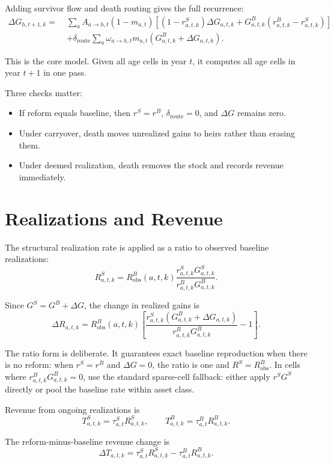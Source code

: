 \documentclass[11pt]{article}
\newcommand{\GB}{G^B}
\newcommand{\GS}{G^S}
\newcommand{\dG}{\Delta G}
\newcommand{\RB}{R^B}
\newcommand{\RS}{R^S}
\newcommand{\dR}{\Delta R}
\newcommand{\dT}{\Delta T}
\newcommand{\dd}{\delta}
\begin{document}
Adding survivor flow and death routing gives the full recurrence:
\[
\boxed{
\begin{aligned}
\dG_{h,t+1,k}
=\;&
\sum_a A_{a \to h,t}(1-m_{a,t})
\left[
(1-r^S_{a,t,k})\dG_{a,t,k}
+
\GB_{a,t,k}(r^B_{a,t,k}-r^S_{a,t,k})
\right] \\
&+
\dd_{\mathrm{route}}
\sum_a
\omega_{a \to h,t}m_{a,t}
\left(\GB_{a,t,k}+\dG_{a,t,k}\right).
\end{aligned}
}
\]

This is the core model. Given all age cells in year $t$, it computes all age
cells in year $t+1$ in one pass.

Three checks matter:

\begin{itemize}
  \item If reform equals baseline, then $r^S=r^B$, $\dd_{\mathrm{route}}=0$,
        and $\dG$ remains zero.
  \item Under carryover, death moves unrealized gains to heirs rather than
        erasing them.
  \item Under deemed realization, death removes the stock and records revenue
        immediately.
\end{itemize}

\section{Realizations and Revenue}

The structural realization rate is applied as a ratio to observed baseline
realizations:
\[
\boxed{
\RS_{a,t,k}
=
\RB_{\mathrm{obs}}(a,t,k)
\frac{
r^S_{a,t,k}\GS_{a,t,k}
}{
r^B_{a,t,k}\GB_{a,t,k}
}.
}
\]

Since $\GS=\GB+\dG$, the change in realized gains is
\[
\boxed{
\dR_{a,t,k}
=
\RB_{\mathrm{obs}}(a,t,k)
\left[
\frac{
r^S_{a,t,k}(\GB_{a,t,k}+\dG_{a,t,k})
}{
r^B_{a,t,k}\GB_{a,t,k}
}
-1
\right].
}
\]

The ratio form is deliberate. It guarantees exact baseline reproduction when
there is no reform: when $r^S=r^B$ and $\dG=0$, the ratio is one and
$\RS=\RB_{\mathrm{obs}}$. In cells where $r^B_{a,t,k}\GB_{a,t,k}=0$, use the
standard sparse-cell fallback: either apply $r^S\GS$ directly or pool the
baseline rate within asset class.

Revenue from ongoing realizations is
\[
T^S_{a,t,k}=\tau^S_{a,t}\RS_{a,t,k},
\qquad
T^B_{a,t,k}=\tau^B_{a,t}\RB_{a,t,k}.
\]

The reform-minus-baseline revenue change is
\[
\boxed{
\dT_{a,t,k}
=
\tau^S_{a,t}\RS_{a,t,k}
-
\tau^B_{a,t}\RB_{a,t,k}.
}
\]
\end{document}
